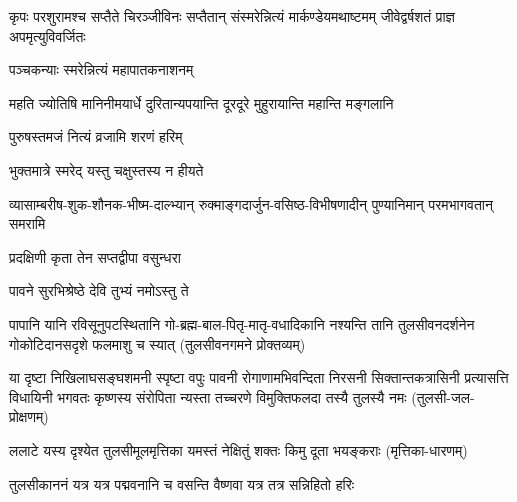
{कृपः परशुरामश्च सप्तैते चिरञ्जीविनः}
{सप्तैतान् संस्मरेन्नित्यं मार्कण्डेयमथाष्टमम्}
{जीवेद्वर्षशतं प्राज्ञ अपमृत्युविवर्जितः}

{पञ्चकन्याः स्मरेन्नित्यं महापातकनाशनम्}

{महति ज्योतिषि मानिनीमयार्धे}
{दुरितान्यपयान्ति दूरदूरे}
{मुहुरायान्ति महान्ति मङ्गलानि}


{पुरुषस्तमजं नित्यं व्रजामि शरणं हरिम्}


{भुक्तमात्रे स्मरेद् यस्तु चक्षुस्तस्य न हीयते}



{व्यासाम्बरीष-शुक-शौनक-भीष्म-दाल्भ्यान्}
{रुक्माङ्गदार्जुन-वसिष्ठ-विभीषणादीन्}
{पुण्यानिमान् परमभागवतान् समरामि}



{प्रदक्षिणी कृता तेन सप्तद्वीपा वसुन्धरा}

{पावने सुरभिश्रेष्ठे देवि तुभ्यं नमोऽस्तु ते}

\closesection

\fourlineindentedshloka
{पापानि यानि रविसूनुपटस्थितानि}
{गो-ब्रह्म-बाल-पितृ-मातृ-वधादिकानि}
{नश्यन्ति तानि तुलसीवनदर्शनेन}
{गोकोटिदानसदृशे फलमाशु च स्यात्}
{(तुलसीवनगमने प्रोक्तव्यम्)}

\fourlineindentedshloka
{या दृष्टा निखिलाघसङ्घशमनी स्पृष्टा वपुः पावनी}
{रोगाणामभिवन्दिता निरसनी सिक्तान्तकत्रासिनी}
{प्रत्यासत्ति विधायिनी भगवतः कृष्णस्य संरोपिता}
{न्यस्ता तच्चरणे विमुक्तिफलदा तस्यै तुलस्यै नमः}
(तुलसी-जल-प्रोक्षणम्)

\twolineshloka
{ललाटे यस्य दृश्येत तुलसीमूलमृत्तिका}
{यमस्तं नेक्षितुं शक्तः किमु दूता भयङ्कराः}
(मृत्तिका-धारणम्)

\twolineshloka
{तुलसीकाननं यत्र यत्र पद्मवनानि च}
{वसन्ति वैष्णवा यत्र तत्र सन्निहितो हरिः}

